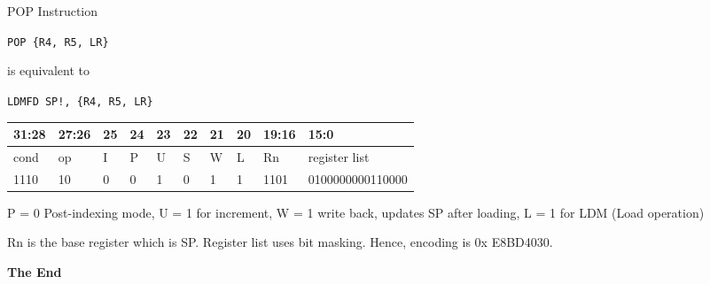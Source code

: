 \documentclass[aspectratio=169]{beamer}
\begin{document}
\begin{frame}{POP Instruction}

    \begin{tcolorbox}[
        enhanced,
        colback=androidBlueLight,
        colframe=androidBlue,
        arc=5pt,
        boxrule=1pt,
        title=\textbf{},
        fonttitle=\bfseries,
        coltitle=black,
        top=10pt,
        bottom=8pt,
        left=8pt,
        right=8pt,
        attach boxed title to top left={xshift=10pt, yshift=-\tcboxedtitleheight/2},
        boxed title style={
            colback=androidBlue,    
            colframe=androidBlue,
            arc=3pt,
            boxrule=0pt,
            left=6pt, right=6pt,
            top=3pt, bottom=3pt
        }
        ]
        
        
        \texttt{POP \{R4, R5, LR\} }

        \vspace{0.5em}

        is equivalent to 

        \vspace{0.5em}

        \texttt{LDMFD SP!,  \{R4, R5, LR\} }

    \end{tcolorbox}

    \footnotesize
    \renewcommand{\arraystretch}{1.2}
    \begin{tabular}{|p{3.0em}|p{3.0em}|p{1.5em}|p{1.5em}|p{1.5em}|p{1.5em}|p{1.5em}|p{1.5em}|p{3.0em}|p{10.0em}|}
    \hline
    31:28 & 27:26 & 25 & 24 & 23 & 22 & 21 & 20 & 19:16 & 15:0\\
    \hline
    cond & op & I & P & U & S & W & L & Rn & register list\\
    \hline
    1110 & 10 & 0 & 0 & 1 & 0 & 1 & 1 & 1101 & 0100000000110000 \\
    \hline
    \end{tabular}

    \vspace{0.5em}


    P = 0 Post-indexing mode, U = 1 for increment, W = 1 write back, updates SP after loading, L = 1 for LDM (Load operation)

    Rn is the base register which is SP. Register list uses bit masking. Hence, encoding is 0x E8BD4030.

    
\end{frame}





    \begin{frame}
        \Huge{\centerline{\color{androidGreen}\textbf{The End}}}
    \end{frame}
    
    
\end{document}
